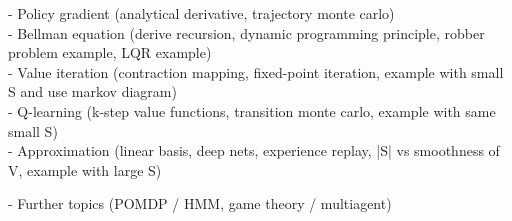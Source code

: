 \vspace{0.2in}

- Policy gradient (analytical derivative, trajectory monte carlo)\\

- Bellman equation (derive recursion, dynamic programming principle, robber problem example, LQR example)\\

- Value iteration (contraction mapping, fixed-point iteration, example with small S and use markov diagram)\\

- Q-learning (k-step value functions, transition monte carlo, example with same small S)\\

- Approximation (linear basis, deep nets, experience replay, |S| vs smoothness of V, example with large S)

- Further topics (POMDP / HMM, game theory / multiagent)






